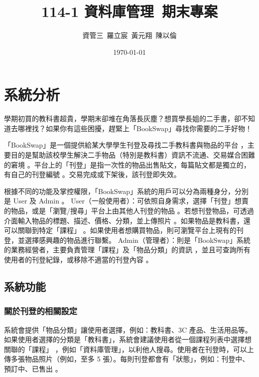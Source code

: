 \documentclass[a4paper]{article}
\title{114-1 資料庫管理\ 期末專案}
\author{資管三~羅立宸~黃元翔~陳以倫}
\date{\today} %
\begin{document}
\maketitle %

\section{系統分析} %
學期初買的教科書超貴，學期末卻堆在角落長灰塵？想買學長姐的二手書，卻不知道去哪裡找？如果你有這些困擾，趕緊上「BookSwap」尋找你需要的二手好物！

「BookSwap」是一個提供給某大學學生刊登及尋找二手教科書與物品的平台 ，主要目的是幫助該校學生解決二手物品（特別是教科書）資訊不流通、交易媒合困難的窘境 。平台上的「刊登」是指一次性的物品出售貼文，每篇貼文都是獨立的，有自己的刊登編號 。交易完成或下架後，該刊登即失效。

根據不同的功能及掌控權限，「BookSwap」系統的用戶可以分為兩種身分，分別是 User 及 Admin 。
User（一般使用者）：可依照自身需求，選擇「刊登」想賣的物品，或是「瀏覽/搜尋」平台上由其他人刊登的物品 。若想刊登物品，可透過介面輸入物品的標題、描述、價格、分類，並上傳照片 。如果物品是教科書，還可以關聯到特定「課程」 。如果使用者想購買物品，則可瀏覽平台上現有的刊登，並選擇感興趣的物品進行聯繫。
Admin（管理者）：則是「BookSwap」系統的業務經營者，主要負責管理「課程」及「物品分類」的資訊 ，並且可查詢所有使用者的刊登紀錄，或移除不適當的刊登內容 。
\subsection{系統功能}
\subsubsection{關於刊登的相關設定}
系統會提供「物品分類」讓使用者選擇，例如：教科書、3C 產品、生活用品等。如果使用者選擇的分類是「教科書」，系統會建議使用者從一個課程列表中選擇想關聯的「課程」 ，例如「資料庫管理」，以利他人搜尋。使用者在刊登時，可以上傳多張物品照片（例如，至多 5 張）。每則刊登都會有「狀態」，例如：刊登中、預訂中、已售出 。
\end{document}
